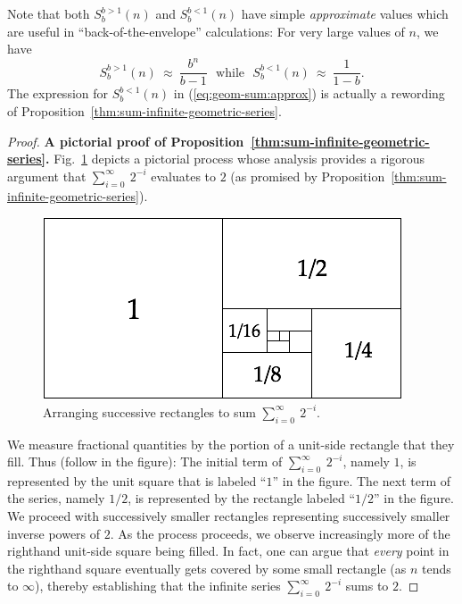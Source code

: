 Note that both $S^{b>1}_{b}(n)$ and $S^{b<1}_{b}(n)$ have simple {\em
  approximate} values which are useful in ``back-of-the-envelope''
calculations: For very large values of $n$, we have
\begin{equation}
\label{eq:geom-sum:approx}
S^{b>1}_{b}(n) \ \approx \ \frac{b^n}{b-1} \ \ \
\mbox{while} \ \ \
S^{b<1}_{b}(n) \ \approx \ \frac{1}{1-b} .
\end{equation}
The expression for $S^{b<1}_{b}(n)$ in (\ref{eq:geom-sum:approx}) is
actually a rewording of
Proposition~\ref{thm:sum-infinite-geometric-series}.

\medskip

\begin{proof}
{\bf A pictorial proof of Proposition~\ref{thm:sum-infinite-geometric-series}.}
%
Fig.~\ref{fig:sumGeoBasis} depicts a pictorial process whose analysis
provides a rigorous argument that $\displaystyle \sum_{i=0}^\infty
\ 2^{-i}$ evaluates to $2$ (as promised by
Proposition~\ref{thm:sum-infinite-geometric-series}).
\begin{figure}[ht]
\begin{center}
       \includegraphics[scale=0.4]{FiguresMaths/SumGeometric1sur2Bis}
 \caption{Arranging successive rectangles to sum $\displaystyle
   \sum_{i=0}^\infty \ 2^{-i}$.}
       \label{fig:sumGeoBasis}
\end{center}
\end{figure}
We measure fractional quantities by the portion of a unit-side
rectangle that they fill.  Thus (follow in the figure): The initial
term of $\displaystyle \sum_{i=0}^\infty \ 2^{-i}$, namely $1$, is
represented by the unit square that is labeled ``$1$'' in the figure.
The next term of the series, namely $1/2$, is represented by the
rectangle labeled ``$1/2$'' in the figure.  We proceed with
successively smaller rectangles representing successively smaller
inverse powers of $2$.  As the process proceeds, we observe
increasingly more of the righthand unit-side square being filled.  In
fact, one can argue that {\em every} point in the righthand square
eventually gets covered by some small rectangle (as $n$ tends to
$\infty$), thereby establishing that the infinite series
$\displaystyle \sum_{i=0}^\infty \ 2^{-i}$ sums to $2$.


\end{proof}
